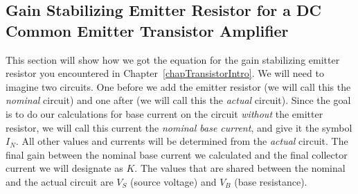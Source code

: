 


\subsection{Gain Stabilizing Emitter Resistor for a DC Common Emitter Transistor Amplifier}
\label{eqGainStabilizingEmitterResistorDCCommonEmitter}


This section will show how we got the equation for the gain stabilizing emitter resistor you encountered in Chapter~\ref{chapTransistorIntro}.
We will need to imagine two circuits.
One before we add the emitter resistor (we will call this the \emph{nominal} circuit) and one after (we will call this the \emph{actual} circuit).
Since the goal is to do our calculations for base current on the circuit \emph{without} the emitter resistor, we will call this current the \emph{nominal base current}, and give it the symbol $I_N$.
All other values and currents will be determined from the \emph{actual} circuit.
The final gain between the nominal base current we calculated and the final collector current we will designate as $K$.
The values that are shared between the nominal and the actual circuit are $V_S$ (source voltage) and $V_B$ (base resistance).

